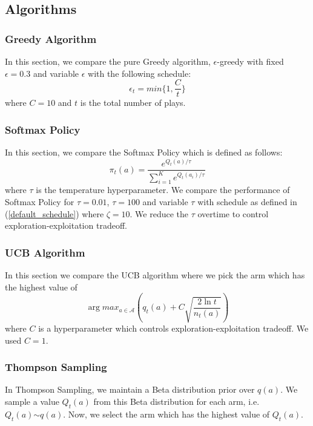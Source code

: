 \documentclass{article}
\begin{document}
	\subsection{Algorithms}
		\subsubsection{Greedy Algorithm}
		
		In this section, we compare the pure Greedy algorithm, $\epsilon$-greedy with fixed $\epsilon=0.3$ and variable $\epsilon$ with the 
		following schedule:
		\begin{equation}
			\epsilon_{t} = min\{1, \frac{C}{t}\}
		\label{epsilon_greedy_schedule}
		\end{equation}
		where $C=10$ and $t$ is the total number of plays.
		
		\subsubsection{Softmax Policy}
		
		In this section, we compare the Softmax Policy which is defined as follows:
		\begin{equation}
		\nonumber
			\pi_{t}(a) = \frac{e^{Q_{t}(a)/\tau}}{\sum_{i=1}^{K} e^{Q_{t}(a_{i})/\tau}}
		\end{equation}
		where $\tau$ is the temperature hyperparameter. We compare the performance of Softmax Policy for $\tau=0.01$, $\tau=100$ and variable $\tau$ with 
		schedule as defined in (\ref{default_schedule}) where $\zeta=10$. We reduce the $\tau$ overtime to control exploration-exploitation tradeoff.
		
		
		\subsubsection{UCB Algorithm}
		In this section we compare the UCB algorithm where we pick the arm which has the highest value of 
		\begin{equation}
		\nonumber
			\arg max_{a \in \mathcal{A}} \left (q_{t}(a) + C\sqrt{\frac{2 \ln t}{n_{t}(a)}} \right )
		\end{equation}
		where $C$ is a hyperparameter which controls exploration-exploitation tradeoff. We used $C=1$. 
		
		\subsubsection{Thompson Sampling}
		In Thompson Sampling, we maintain a Beta distribution prior over $q(a)$. We sample a value $Q_{t}(a)$ from this Beta distribution for each arm, i.e.
		$Q_{t}(a) \stackrel{}{\sim} q(a)$. Now, we select the arm which has the highest value of $Q_{t}(a)$.
		
\end{document}
